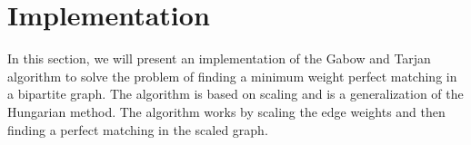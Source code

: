 \section{Implementation}
In this section, we will present an implementation of the Gabow and Tarjan algorithm to solve the problem of finding a minimum weight perfect matching in a bipartite graph. The algorithm is based on scaling and is a generalization of the Hungarian method. The algorithm works by scaling the edge weights and then finding a perfect matching in the scaled graph. 
